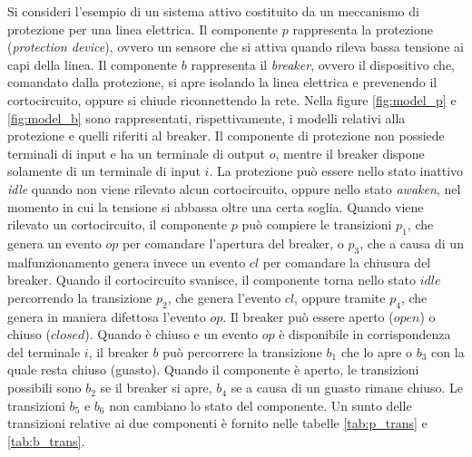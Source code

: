 \begin{ex}\label{ex:modelli}
Si consideri l'esempio di un sistema attivo costituito da un meccanismo di protezione per una linea elettrica. Il componente $p$ rappresenta la protezione (\emph{protection device}), ovvero un sensore che si attiva quando rileva bassa tensione ai capi della linea. Il componente $b$ rappresenta il \emph{breaker}, ovvero il dispositivo che, comandato dalla protezione, si apre isolando la linea elettrica e prevenendo il cortocircuito, oppure si chiude riconnettendo la rete. Nella figure \ref{fig:model_p} e \ref{fig:model_b}  sono rappresentati, rispettivamente, i modelli relativi alla protezione e quelli riferiti al breaker.
Il componente di protezione non possiede terminali di input e ha un terminale di output $o$, mentre il breaker dispone solamente di un terminale di input $i$.
La protezione può essere nello stato inattivo \emph{idle} quando non viene rilevato alcun cortocircuito, oppure nello stato \emph{awaken}, nel momento in cui la tensione si abbassa oltre una certa soglia. Quando viene rilevato un cortocircuito, il componente $p$ può compiere le transizioni $p_1$, che genera un evento $op$ per comandare l'apertura del breaker, o $p_3$, che a causa di un malfunzionamento genera invece un evento $cl$ per comandare la chiusura del breaker. Quando il cortocircuito svanisce, il componente torna nello stato $idle$ percorrendo la transizione $p_2$, che genera l'evento $cl$, oppure tramite $p_4$, che genera in maniera difettosa l'evento $op$.
Il breaker può essere aperto ($open$) o chiuso ($closed$). Quando è chiuso e un evento $op$ è disponibile in corrispondenza del terminale $i$, il breaker $b$ può percorrere la transizione $b_1$ che lo apre o $b_3$ con la quale resta chiuso (guasto). Quando il componente è aperto, le transizioni possibili sono $b_2$ se il breaker si apre, $b_4$ se a causa di un guasto rimane chiuso. Le transizioni $b_5$ e $b_6$ non cambiano lo stato del componente.
Un sunto delle transizioni relative ai due componenti è fornito nelle tabelle \ref{tab:p_trans} e \ref{tab:b_trans}.
\end{ex}

